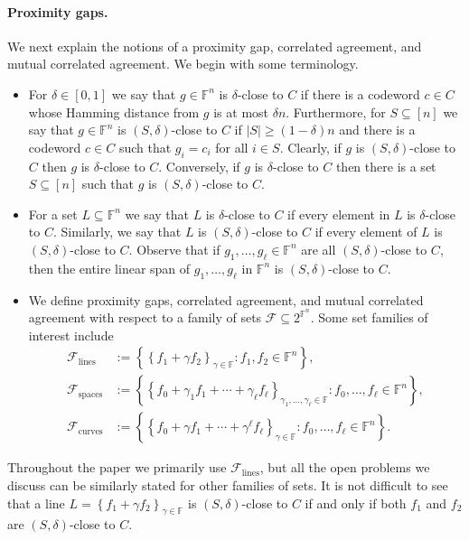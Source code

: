 \documentclass[11pt]{article}
\theoremstyle{plain}
\theoremstyle{definition}
\newcommand{\F}{\mathbb{F}}
\newcommand{\calF}{\mathcal{F}}
\newcommand{\set}[1]{\left\{#1\right\}}
\newcommand{\abs}[1]{\left|#1\right|}
\begin{document}
\paragraph{Proximity gaps.}
We next explain the notions of a proximity gap, correlated agreement, and mutual correlated agreement. We begin with some terminology.

\begin{itemize}
  \item For $\delta\in[0,1]$ we say that $g\in\F^n$ is $\delta$-close to $C$ if there is a codeword $c\in C$ whose Hamming distance from $g$ is at most $\delta n$. Furthermore, for $S\subseteq[n]$ we say that $g\in\F^n$ is $(S,\delta)$-close to $C$ if $\abs{S}\ge (1-\delta)n$ and there is a codeword $c\in C$ such that $g_i=c_i$ for all $i\in S$. Clearly, if $g$ is $(S,\delta)$-close to $C$ then $g$ is $\delta$-close to $C$. Conversely, if $g$ is $\delta$-close to $C$ then there is a set $S\subseteq[n]$ such that $g$ is $(S,\delta)$-close to $C$.

  \item For a set $L\subseteq\F^n$ we say that $L$ is $\delta$-close to $C$ if every element in $L$ is $\delta$-close to $C$. Similarly, we say that $L$ is $(S,\delta)$-close to $C$ if every element of $L$ is $(S,\delta)$-close to $C$. Observe that if $g_1,\ldots,g_\ell\in\F^n$ are all $(S,\delta)$-close to $C$, then the entire linear span of $g_1,\ldots,g_\ell$ in $\F^n$ is $(S,\delta)$-close to $C$.

  \item We define proximity gaps, correlated agreement, and mutual correlated agreement with respect to a family of sets $\calF\subseteq 2^{\F^n}$. Some set families of interest include
  \begin{align*}
    \calF_{\mathrm{lines}} &:= \set{\set{f_1+\gamma f_2}_{\gamma\in\F} : f_1,f_2\in\F^n},\\
    \calF_{\mathrm{spaces}} &:= \set{\set{f_0+\gamma_1 f_1+\cdots+\gamma_\ell f_\ell}_{\gamma_1,\ldots,\gamma_\ell\in\F} : f_0,\ldots,f_\ell\in\F^n},\\
    \calF_{\mathrm{curves}} &:= \set{\set{f_0+\gamma f_1+\cdots+\gamma^\ell f_\ell}_{\gamma\in\F} : f_0,\ldots,f_\ell\in\F^n}.
  \end{align*}
\end{itemize}
Throughout the paper we primarily use $\calF_{\mathrm{lines}}$, but all the open problems we discuss can be similarly stated for other families of sets. It is not difficult to see that a line $L=\set{f_1+\gamma f_2}_{\gamma\in\F}$ is $(S,\delta)$-close to $C$ if and only if both $f_1$ and $f_2$ are $(S,\delta)$-close to $C$.
\end{document}
